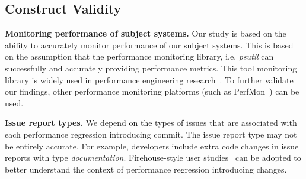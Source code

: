 \subsection{Construct Validity}

\textbf{Monitoring performance of subject systems.} Our study is based on the ability to accurately monitor performance of our subject systems. This is based on the assumption that the performance monitoring library, i.e. \emph{psutil} can successfully and accurately providing performance metrics. This tool monitoring library is widely used in performance engineering research~\cite{peterfse,tarekmsr16}. To further validate our findings, other performance monitoring platforms (such as PerfMon~\cite{perfmon}) can be used. 

\textbf{Issue report types. }We depend on the types of issues that are associated with each performance regression introducing commit. The issue report type may not be entirely accurate. For example, developers include extra code changes in issue reports with type \emph{documentation}. Firehouse-style user studies~\cite{thomasfritzfirehouse} can be adopted to better understand the context of performance regression introducing changes. 



